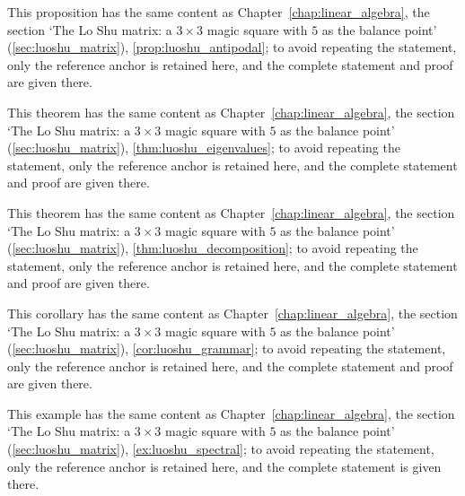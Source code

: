 \begin{proposition}\label{prop:luoshu_antipodal_yijing}
This proposition has the same content as Chapter~\ref{chap:linear_algebra}, the section `The Lo Shu matrix: a $3\times 3$ magic square with $5$ as the balance point' (\cref{sec:luoshu_matrix}), \cref{prop:luoshu_antipodal}; to avoid repeating the statement, only the reference anchor is retained here, and the complete statement and proof are given there.
\end{proposition}

\begin{theorem}\label{thm:luoshu_eigenvalues_yijing}
This theorem has the same content as Chapter~\ref{chap:linear_algebra}, the section `The Lo Shu matrix: a $3\times 3$ magic square with $5$ as the balance point' (\cref{sec:luoshu_matrix}), \cref{thm:luoshu_eigenvalues}; to avoid repeating the statement, only the reference anchor is retained here, and the complete statement and proof are given there.
\end{theorem}

\begin{theorem}\label{thm:luoshu_decomposition_yijing}
This theorem has the same content as Chapter~\ref{chap:linear_algebra}, the section `The Lo Shu matrix: a $3\times 3$ magic square with $5$ as the balance point' (\cref{sec:luoshu_matrix}), \cref{thm:luoshu_decomposition}; to avoid repeating the statement, only the reference anchor is retained here, and the complete statement and proof are given there.
\end{theorem}

\begin{corollary}\label{cor:luoshu_structure}
This corollary has the same content as Chapter~\ref{chap:linear_algebra}, the section `The Lo Shu matrix: a $3\times 3$ magic square with $5$ as the balance point' (\cref{sec:luoshu_matrix}), \cref{cor:luoshu_grammar}; to avoid repeating the statement, only the reference anchor is retained here, and the complete statement and proof are given there.
\end{corollary}

\begin{example}\label{ex:luoshu_spectral_yijing}
This example has the same content as Chapter~\ref{chap:linear_algebra}, the section `The Lo Shu matrix: a $3\times 3$ magic square with $5$ as the balance point' (\cref{sec:luoshu_matrix}), \cref{ex:luoshu_spectral}; to avoid repeating the statement, only the reference anchor is retained here, and the complete statement is given there.
\end{example}

